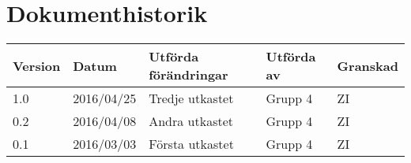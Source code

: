 \documentclass[11pt]{article}
\begin{document}
\tableofcontents

\pagebreak
\section*{Dokumenthistorik}
\begin{table}[h]
\begin{tabular}{|l|l|l|l|l|} \hline

\textbf{Version} & \textbf{Datum} & \textbf{Utförda förändringar} & \textbf{Utförda av} & \textbf{Granskad} \\ \hline
1.0 & 2016/04/25 & Tredje utkastet & Grupp 4 & ZI \\ \hline
0.2 & 2016/04/08 & Andra utkastet & Grupp 4 & ZI \\ \hline
0.1 & 2016/03/03 & Första utkastet & Grupp 4 & ZI \\ \hline

\end{tabular}
\end{table}

\pagebreak
{}
\end{document}
